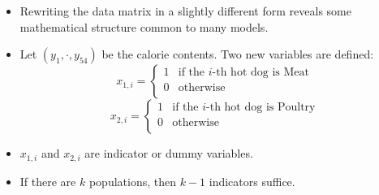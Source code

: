 \begin{frame}
  \begin{itemize}
    \vspace{0.25cm}
    \item Rewriting the data matrix in a slightly different form reveals some mathematical structure common to many models.
    \vspace{0.25cm}
    \item Let $ (y_1, \cdot, y_{54}) $ be the calorie contents. Two new variables are defined:
      $$
        x_{1,i} = \left\{ 
        \begin{array}{ll}
          1 & \text{if the }i\text{-th hot dog is Meat} \\
          0 & \text{otherwise} \\
        \end{array} \right.
      $$
      $$
        x_{2,i} = \left\{ 
        \begin{array}{ll}
          1 & \text{if the }i\text{-th hot dog is Poultry} \\
          0 & \text{otherwise} \\
        \end{array} \right.
      $$
    \vspace{0.25cm}
    \item $ x_{1,i} $ and $ x_{2,i} $ are indicator or dummy variables.
    \vspace{0.25cm}
    \item If there are $ k $ populations, then $ k-1 $ indicators suffice.
  \end{itemize}
\end{frame}

